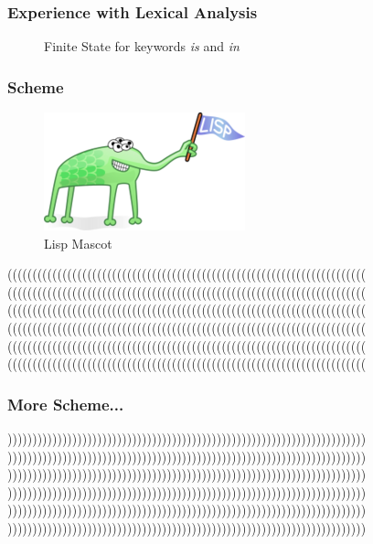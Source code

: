 \documentclass{beamer}
\begin{document}
\begin{frame}
\frametitle{Experience with Lexical Analysis}
\begin{figure} 
    \caption{Finite State for keywords \textit{is} and \textit{in}}
\end{figure}
\end{frame}

\begin{frame}
\frametitle{Scheme}
\begin{figure}
    \centering
    \includegraphics[scale=0.45]{lisp.png}
    \caption{Lisp Mascot \cite{seasoned}}
    \label{fig:enter-label}
\end{figure}
((((((((((((((((((((((((((((((((((((((((((((((((((((((((((((((((((((((((
((((((((((((((((((((((((((((((((((((((((((((((((((((((((((((((((((((((((
((((((((((((((((((((((((((((((((((((((((((((((((((((((((((((((((((((((((
((((((((((((((((((((((((((((((((((((((((((((((((((((((((((((((((((((((((
((((((((((((((((((((((((((((((((((((((((((((((((((((((((((((((((((((((((
((((((((((((((((((((((((((((((((((((((((((((((((((((((((((((((((((((((((
\end{frame}

\begin{frame}
\frametitle{More Scheme...}
))))))))))))))))))))))))))))))))))))))))))))))))))))))))))))))))))))))))
))))))))))))))))))))))))))))))))))))))))))))))))))))))))))))))))))))))))
))))))))))))))))))))))))))))))))))))))))))))))))))))))))))))))))))))))))
))))))))))))))))))))))))))))))))))))))))))))))))))))))))))))))))))))))))
))))))))))))))))))))))))))))))))))))))))))))))))))))))))))))))))))))))))
))))))))))))))))))))))))))))))))))))))))))))))))))))))))))))))))))))))))
\end{frame}
\end{document}
